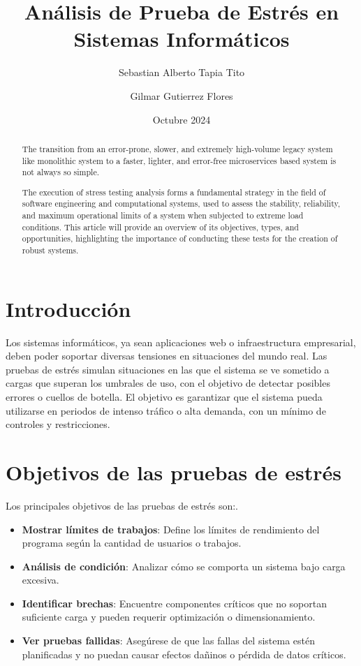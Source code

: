 \documentclass[a4paper,12pt]{article}
\title{Análisis de Prueba de Estrés en Sistemas Informáticos}
\author[1]{Sebastian Alberto Tapia Tito}
\author[2]{Gilmar Gutierrez Flores}
\affil[1]{Universidad Nacional del Altiplano}
\date{Octubre 2024}
\begin{document}
\maketitle

\begin{abstract}
The transition from an error-prone, slower, and extremely high-volume legacy system like monolithic system to a faster, lighter, and error-free microservices based system is not always so simple.\parencite{Aggarwal2024854}

The execution of stress testing analysis forms a fundamental strategy in the field of software engineering and computational systems, used to assess the stability, reliability, and maximum operational limits of a system when subjected to extreme load conditions. This article will provide an overview of its objectives, types, and opportunities, highlighting the importance of conducting these tests for the creation of robust systems.

\end{abstract}

\section{Introducción}
Los sistemas informáticos, ya sean aplicaciones web o infraestructura empresarial, deben poder soportar diversas tensiones en situaciones del mundo real. Las pruebas de estrés simulan situaciones en las que el sistema se ve sometido a cargas que superan los umbrales de uso, con el objetivo de detectar posibles errores o cuellos de botella. El objetivo es garantizar que el sistema pueda utilizarse en periodos de intenso tráfico o alta demanda, con un mínimo de controles y restricciones.
\section{Objetivos de las pruebas de estrés}
Los principales objetivos de las pruebas de estrés son:.
\begin{itemize}
    \item \textbf{Mostrar límites de trabajos}: Define los límites de rendimiento del programa según la cantidad de usuarios o trabajos.
    \item \textbf{Análisis de condición}: Analizar cómo se comporta un sistema bajo carga excesiva.
    \item \textbf {Identificar brechas}: Encuentre componentes críticos que no soportan suficiente carga y pueden requerir optimización o dimensionamiento.
    \item \textbf{Ver pruebas fallidas}: Asegúrese de que las fallas del sistema estén planificadas y no puedan causar efectos dañinos o pérdida de datos críticos.
\end{itemize}
\end{document}
